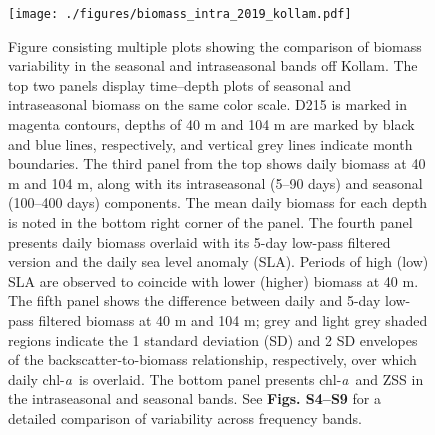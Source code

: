 \documentclass[authoryear,review,11pt]{elsarticle}
\newcommand{\chla}{chl-{\emph{a}}}
\begin{document}
\begin{figure}[htbp]
	\begin{adjustwidth}{-0.5in}{0in} 
		\centering
		\texttt{[image: ./figures/biomass\_intra\_2019\_kollam.pdf]} 
		\captionsetup{justification=justified,font=footnotesize,skip=0.05\baselineskip,width=\textwidth}
		\caption{Figure consisting multiple plots showing the comparison of biomass variability in the seasonal and intraseasonal bands off Kollam. The top two panels display time--depth plots of seasonal and intraseasonal biomass on the same color scale. D215 is marked in magenta contours, depths of 40 m and 104 m are marked by black and blue lines, respectively, and vertical grey lines indicate month boundaries. The third panel from the top shows daily biomass at 40 m and 104 m, along with its intraseasonal (5--90 days) and seasonal (100--400 days) components. The mean daily biomass for each depth is noted in the bottom right corner of the panel. The fourth panel presents daily biomass overlaid with its 5-day low-pass filtered version and the daily sea level anomaly (SLA). Periods of high (low) SLA are observed to coincide with lower (higher) biomass at 40 m. The fifth panel shows the difference between daily and 5-day low-pass filtered biomass at 40 m and 104 m; grey and light grey shaded regions indicate the 1 standard deviation (SD) and 2 SD envelopes of the backscatter-to-biomass relationship, respectively, over which daily \chla\ is overlaid. The bottom panel presents \chla\ and ZSS in the intraseasonal and seasonal bands. See \textbf{Figs. S4--S9} for a detailed comparison of variability across frequency bands.}		
		\label{fig:biomass_intra_2019_kollam}
	\end{adjustwidth}
\end{figure}
\end{document}
